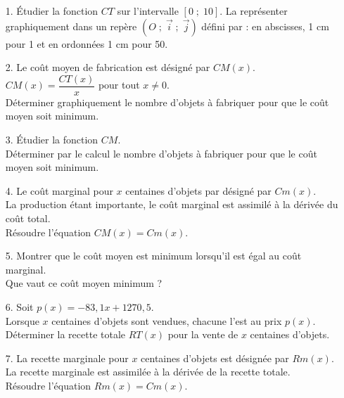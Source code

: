 \begin{itemize}
\item[1.] Étudier la fonction $CT$ sur l'intervalle $\left[0\; ; \; 10\right]$. La représenter graphiquement dans un repère $\left(O \; ;\; \overrightarrow{i} \; ; \; \overrightarrow{j}\right)$ défini par : en abscisses, 1 cm pour 1 et en ordonnées 1 cm pour 50. \\
\item[2.] Le coût moyen de fabrication est désigné par $CM(x)$. $CM(x) = \dfrac{CT(x)}{x}$ pour tout $x \neq 0$. \\

Déterminer graphiquement le nombre d'objets à fabriquer pour que le coût moyen soit minimum. \\

\item[3.] Étudier la fonction $CM$. \\ Déterminer par le calcul le nombre d'objets à fabriquer pour que le coût moyen soit minimum. \\

\item[4.] Le coût marginal pour $x$ centaines d'objets par désigné par $Cm(x)$. \\ La production étant importante, le coût marginal est assimilé à la dérivée du coût total. \\ Résoudre l'équation $CM(x) = Cm(x)$. \\ 

\item[5.] Montrer que le coût moyen est minimum lorsqu'il est égal au coût marginal. \\ Que vaut ce coût moyen minimum ? \\

\item[6.] Soit $p(x) = -83,1x + 1270,5$. \\ Lorsque $x$ centaines d'objets sont vendues, chacune l'est au prix $p(x)$. \\ Déterminer la recette totale $RT(x)$ pour la vente de $x$ centaines d'objets. \\

\item[7.] La recette marginale pour $x$ centaines d'objets est désignée par $Rm(x)$. \\ La recette marginale est assimilée à la dérivée de la recette totale. \\ Résoudre l'équation $Rm(x) = Cm(x)$. \\


\end{itemize}

